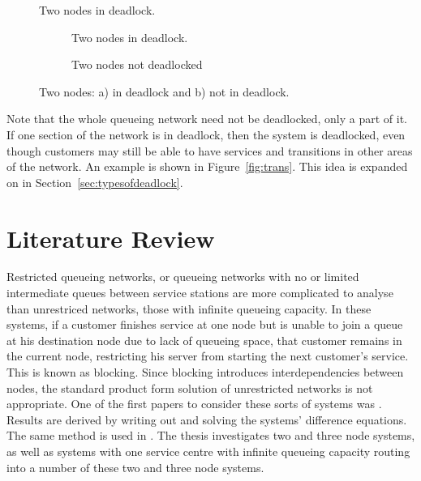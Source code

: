 \documentclass{article}
\begin{document}
\begin{figure}[!htbp]
  \begin{center}
  
  \caption{Two nodes in deadlock.}
  \label{fig:2in_deadlock}
  \end{center}
\end{figure}

\begin{figure}[!htbp]
\begin{subfigure}[b]{0.5\textwidth}
  
  \caption{Two nodes in deadlock.}
  \label{fig:inout_deadlock_in}
\end{subfigure}
\begin{subfigure}[b]{0.5\textwidth}
  
  \caption{Two nodes not deadlocked}
  \label{fig:inout_deadlock_out}
\end{subfigure}
\caption{Two nodes: a) in deadlock and b) not in deadlock.}
\label{fig:inout_deadlock}
\end{figure}

Note that the whole queueing network need not be deadlocked, only a part of it.
If one section of the network is in deadlock, then the system is deadlocked, even though customers may still be able to have services and transitions in other areas of the network.
An example is shown in Figure~\ref{fig:trans}.
This idea is expanded on in Section~\ref{sec:typesofdeadlock}.

\section{Literature Review}\label{sec:litreview}

Restricted queueing networks, or queueing networks with no or limited intermediate queues between service stations are more complicated to analyse than unrestriced networks, those with infinite queueing capacity.
In these systems, if a customer finishes service at one node but is unable to join a queue at his destination node due to lack of queueing space, that customer remains in the current node, restricting his server from starting the next customer's service.
This is known as blocking.
Since blocking introduces interdependencies between nodes, the standard product form solution of unrestricted networks is not appropriate.
One of the first papers to consider these sorts of systems was \cite{hunt56}.
Results are derived by writing out and solving the systems' difference equations.
The same method is used in \cite{baber08}.
The thesis investigates two and three node systems, as well as systems with one service centre with infinite queueing capacity routing into a number of these two and three node systems.
\end{document}
